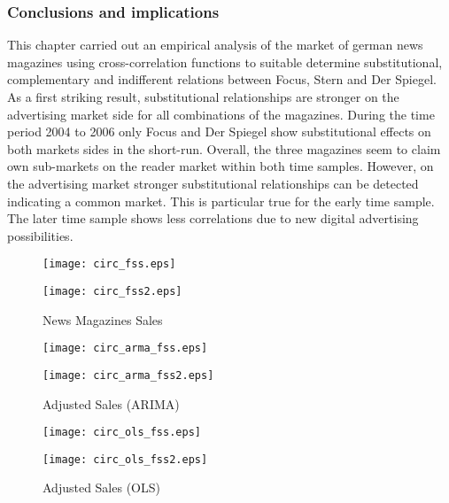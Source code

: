 \documentclass[10pt,a4paper]{scrreprt}
\begin{document}
\subsubsection{Conclusions and implications}
This chapter carried out an empirical analysis of the market of german news magazines using cross-correlation functions to suitable determine substitutional, complementary and indifferent relations between Focus, Stern and Der Spiegel. As a first striking result, substitutional relationships are stronger on the advertising market side for all combinations of the magazines. During the time period 2004 to 2006 only Focus and Der Spiegel show substitutional effects on both markets sides in the short-run. Overall, the three magazines seem to claim own sub-markets on the reader market within both time samples. However, on the advertising market stronger substitutional relationships can be detected indicating a common market. This is particular true for the early time sample. The later time sample shows less correlations due to new digital advertising possibilities. 
 
 
\begin{figure}[H]
\caption{News Magazines Sales}
\begin{minipage}[hbt]{7cm}
	\centering
	\texttt{[image: circ\_fss.eps]}
\end{minipage}
\hfill
\begin{minipage}[hbt]{7cm}
	\centering
	\texttt{[image: circ\_fss2.eps]}
\end{minipage}
\label{fig:fss}
\end{figure}

\begin{figure}[H]
\caption{Adjusted Sales (ARIMA)}
\begin{minipage}[hbt]{7cm}
	\centering
	\texttt{[image: circ\_arma\_fss.eps]}
\end{minipage}
\hfill
\begin{minipage}[hbt]{7cm}
	\centering
	\texttt{[image: circ\_arma\_fss2.eps]}
\end{minipage}
\label{fig:fss_arima}
\end{figure}

\begin{figure}[H]
\caption{Adjusted Sales (OLS)}
\begin{minipage}[hbt]{7cm}
	\centering
	\texttt{[image: circ\_ols\_fss.eps]}
\end{minipage}
\hfill
\begin{minipage}[hbt]{7cm}
	\centering
	\texttt{[image: circ\_ols\_fss2.eps]}
\end{minipage}
\label{fig:fss_ols}
\end{figure}
\end{document}
